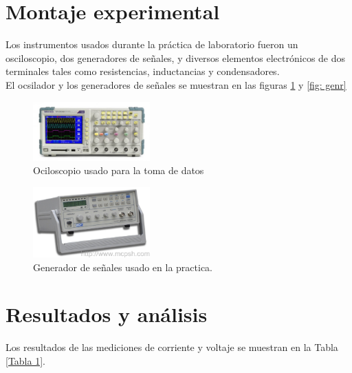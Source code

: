 \documentclass[prb,aps,twocolumn,preprintnumbers,amsmath,amssymb]{revtex4}
\begin{document}
\section{Montaje experimental}

Los instrumentos usados durante la práctica de laboratorio fueron un osciloscopio, dos generadores de señales, y diversos elementos electrónicos de dos terminales tales como resistencias, inductancias y condensadores.\\

El ocsilador y los generadores de señales se muestran en las figuras \ref{fig: osci} y \ref{fig: genr}

\begin{figure}[h!]
	\centering
	\includegraphics[width=0.4\textwidth]{osciloscopio}
	\caption{Ociloscopio usado para la toma de datos}
	\label{fig: osci}
\end{figure}

\begin{figure}[h!]
	\centering
	\includegraphics[width=0.4\textwidth]{generador}
	\caption{Generador de señales usado en la practica.}
	\label{fig: RLC}
\end{figure}

\section{Resultados y análisis}

Los resultados de las mediciones de corriente y voltaje se muestran en la Tabla \ref{Tabla 1}.\\
\end{document}
